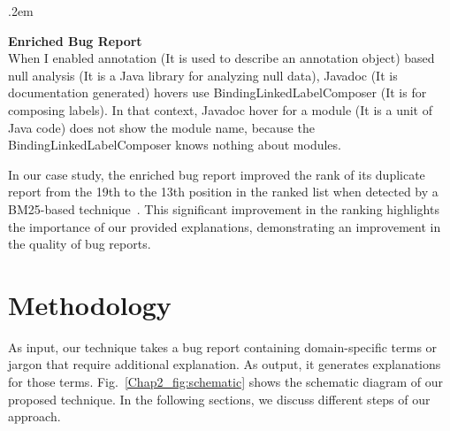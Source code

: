 \FrameSep.2em
\begin{frshaded}
\label{enrichedbugreport}
\noindent
 \textbf{Enriched Bug Report} \\
When I enabled annotation (It is used to describe an annotation object) based null analysis (It is a Java library for analyzing null data), Javadoc (It is documentation generated) hovers use BindingLinkedLabelComposer (It is for composing labels). In that context, Javadoc hover for a module (It is a unit of Java code) does not show the module name, because the BindingLinkedLabelComposer knows nothing about modules.
\end{frshaded}

In our case study, the enriched bug report improved the rank of its duplicate report from the 19th to the 13th position in the ranked list when detected by a BM25-based technique~\cite{yang2012duplication,jahan2023towards}. This significant improvement in the ranking highlights the importance of our provided explanations, demonstrating an improvement in the quality of bug reports.

\section{Methodology} \label{Chap2:Methodology}

As input, our technique takes a bug report containing domain-specific terms or jargon that require additional explanation. As output, it generates explanations for those terms. Fig.~\ref{Chap2_fig:schematic} shows the schematic diagram of our proposed technique. In the following sections, we discuss different steps of our approach.\par 

